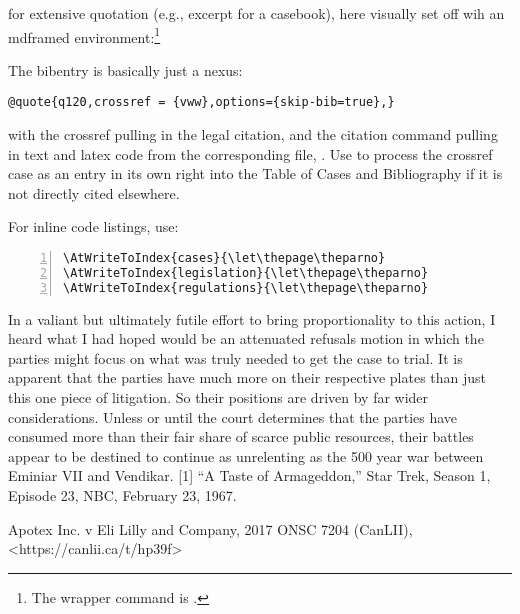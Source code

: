 \p {} for extensive quotation (e.g., excerpt for a casebook), here visually set off wih an mdframed environment:\footnote{The wrapper command is .}


\p The bibentry is basically just a nexus:

\bigskip
\begin{verbatim}
@quote{q120,crossref = {vww},options={skip-bib=true},}
\end{verbatim}

\bigskip
with the crossref pulling in the legal citation, and the citation command pulling in text and latex code from the corresponding file, . Use  to process the crossref case as an entry in its own right into the Table of Cases and Bibliography if it is not directly cited elsewhere.\nocite{vww}

\p For inline code listings, use:

{
\begin{Example}[formatcom=\color{blue}]
\bigskip
\begin{mdframed}[backgroundcolor=green!40!yellow!12]
\begin{Verbatim}[numbers=left,numbersep=2pt]
\AtWriteToIndex{cases}{\let\thepage\theparno}
\AtWriteToIndex{legislation}{\let\thepage\theparno}
\AtWriteToIndex{regulations}{\let\thepage\theparno}
\end{Verbatim}


\end{mdframed}

\end{Example}
}
%
%







   In a valiant but ultimately futile effort to bring proportionality to this action, I heard what I had hoped would be an attenuated refusals motion in which the parties might focus on what was truly needed to get the case to trial. It is apparent that the parties have much more on their respective plates than just this one piece of litigation. So their positions are driven by far wider considerations. Unless or until the court determines that the parties have consumed more than their fair share of scarce public resources, their battles appear to be destined to continue as unrelenting as the 500 year war between Eminiar VII and Vendikar.
   [1]
    “A Taste of Armageddon,” Star Trek, Season 1, Episode 23, NBC, February 23, 1967.
    
    Apotex Inc. v Eli Lilly and Company, 2017 ONSC 7204 (CanLII), <https://canlii.ca/t/hp39f>
    
    